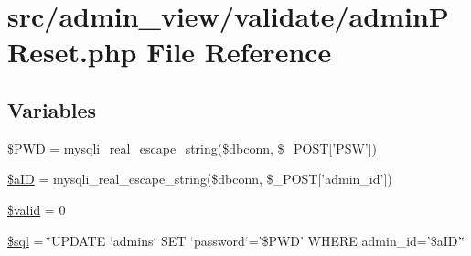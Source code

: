 \hypertarget{adminPReset_8php}{\section{src/admin\-\_\-view/validate/admin\-P\-Reset.php \-File \-Reference}
\label{adminPReset_8php}
}
\subsection*{\-Variables}
\begin{DoxyCompactItemize}
\item 
\hyperlink{adminPReset_8php_ad10f6388800bdf18e795c1afd61faab1}{\$\-P\-W\-D} = mysqli\-\_\-real\-\_\-escape\-\_\-string(\$dbconn, \$\-\_\-\-P\-O\-S\-T\mbox{[}'\-P\-S\-W'\mbox{]})
\item 
\hyperlink{adminPReset_8php_a493f3ef0624131954dba9970f1808e66}{\$a\-I\-D} = mysqli\-\_\-real\-\_\-escape\-\_\-string(\$dbconn, \$\-\_\-\-P\-O\-S\-T\mbox{[}'admin\-\_\-id'\mbox{]})
\item 
\hyperlink{adminPReset_8php_a0587674d27d00ef497e08e53ccf45bbb}{\$valid} = 0
\item 
\hyperlink{adminPReset_8php_a047170d6020a882807665812a27e2525}{\$sql} = \char`\"{}\-U\-P\-D\-A\-T\-E `admins` \-S\-E\-T `password`='\$\-P\-W\-D' \-W\-H\-E\-R\-E admin\-\_\-id='\$a\-I\-D'\char`\"{}
\end{DoxyCompactItemize}


